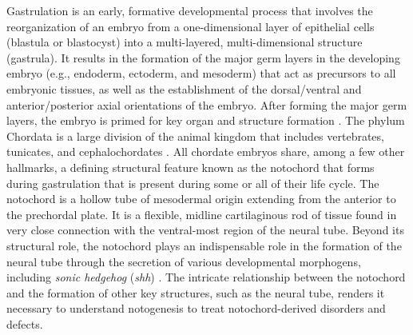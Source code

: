 Gastrulation is an early, formative developmental process that involves the reorganization of an embryo from a one-dimensional layer of epithelial cells (blastula or blastocyst) into a multi-layered, multi-dimensional structure (gastrula). It results in the formation of the major germ layers in the developing embryo (e.g., endoderm, ectoderm, and mesoderm) that act as precursors to all embryonic tissues, as well as the establishment of the dorsal/ventral and anterior/posterior axial orientations of the embryo. After forming the major germ layers, the embryo is primed for key organ and structure formation \cite{winkley2020,solnica-krezel2012,ghimire2021,perry2010}. The phylum Chordata is a large division of the animal kingdom that includes vertebrates, tunicates, and cephalochordates \cite{delsuc2006,holland2005,davidson2006,dehal2002}. All chordate embryos share, among a few other hallmarks, a defining structural feature known as the notochord that forms during gastrulation that is present during some or all of their life cycle. The notochord is a hollow tube of mesodermal origin extending from the anterior to the prechordal plate. It is a flexible, midline cartilaginous rod of tissue found in very close connection with the ventral-most region of the neural tube. Beyond its structural role, the notochord plays an indispensable role in the formation of the neural tube through the secretion of various developmental morphogens, including \textit{sonic hedgehog} (\textit{shh}) \cite{holland2005,reeves2017,reeves2021,barnett1998,lawson2015,davidson2006,ikeda2016,levine2005,balmer2016,corallo2015,stemple2004,ang1994,digregorio2020,jiang2007,scott2004,debree2018,stemple2005,herrmann1994}. The intricate relationship between the notochord and the formation of other key structures, such as the neural tube, renders it necessary to understand notogenesis to treat notochord-derived disorders and defects. 

